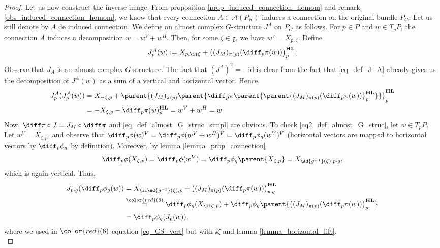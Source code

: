 \begin{proof}
    Let us now construct the inverse image. From proposition \ref{prop_induced_connection_homom} and remark \ref{obs_induced_connection_homom}, we know that every connection \(A \in \mathscr{A}(P_K)\) induces a connection on the original bundle \(P_G\). Let us still denote by \(A\) de induced connection. We define an almost complex \(G\)-structure \(J^A\) on \(P_G\) as follows. For \(p \in P\) and \(w \in T_pP\), the connection \(A\) induces a decomposition \(w=w^V+w^H\). Then, for some \(\zeta \in \mathfrak{g}\), we have \(w^V=X_{p, \zeta}\). Define
    \begin{equation} \label{eq_def_J_A}
    J^A_p(w):=X_{p, \ii \zeta} + \big((J_{M})_{\pi(p)}(\diff_p \pi(w)) \big)^{\mathbf{HL}}_p.
    \end{equation}
    Observe that \(J_A\) is an almost complex \(G\)-structure. The fact that \((J^A)^2=-\mathrm{id}\) is clear from the fact that \eqref{eq_def_J_A} already gives us the decomposition of \(J^A(w)\) as a sum of a vertical and horizontal vector. Hence, 
    \begin{align*}
    J^A_p(J^A_p(w)) & =X_{ -\zeta,p}+ \parent{(J_M)_{\pi(p)}\parent{\diff_p\pi\parent{\parent{(J_{M})_{\pi(p)}(\diff_p \pi(w)) }_p^{\mathbf{HL}}}}}^{\mathbf{HL}}_p \\
    &= -X_{\zeta,p}-\diff_p\pi(w)^{\mathbf{HL}}_p=w^V+w^H=w.
    \end{align*}
    Now, \(\diff\pi\circ J=J_M \circ \diff\pi\) and \eqref{eq_def_almost_G_struc_simpl} are obvious. To check \eqref{eq2_def_almost_G_struc}, let \(w\in T_pP\). Let \(w^V=X_{\zeta, p}\), and observe that \(\diff_p\phi(w)^V=\diff_p\phi(w^V+w^H)^V=\diff_p\phi_g(w^V)^V\) (horizontal vectors are mapped to horizontal vectors by \(\diff_p\phi_g\) by definition). Moreover, by lemma \ref{lemma_prop_connection}
    \begin{equation} \label{eq_CS_vert}
    \diff_p\phi(X_{\zeta, p})=\diff_p\phi(w^V)=\diff_p\phi_g\parent{X_{\zeta,p}}=X_{\Ad{g^{-1}}(\zeta), p\cdot g},
    \end{equation}
    which is again vertical. Thus,
    \begin{align*}
        J_{p\cdot g}(\diff_p\phi_g(w)) & = X_{\ii \Ad{g^{-1}}(\zeta), p} + \big((J_{M})_{\pi(p)}(\diff_p \pi(w)) \big)^{\mathbf{HL}}_{p\cdot g} \\
        & \overset{{\color{red}(6)}}{=} \diff_p\phi_g(X_{\ii \zeta, p})+\diff_p\phi_g \parent{\big((J_{M})_{\pi(p)}(\diff_p \pi(w)) \big)^{\mathbf{HL}}_{p}} \\
        & = \diff_p\phi_g(J_p(w)),
    \end{align*}
    where we used in \({\color{red}(6)}\) equation \eqref{eq_CS_vert} but with \(\ii \zeta\) and lemma \ref{lemma_horizontal_lift}. \\


\end{proof}
